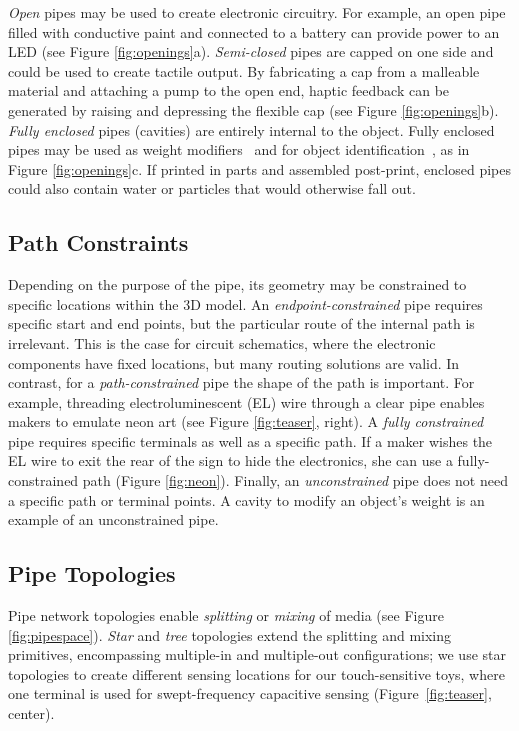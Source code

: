 \emph{Open} pipes may be used to create electronic circuitry.  For example, an open pipe filled with conductive paint and connected to a battery can provide power to an LED (see Figure \ref{fig:openings}a).
%
\emph{Semi-closed} pipes are capped on one side and could be used to create tactile output. By fabricating a cap from a malleable material and attaching a pump to the open end, haptic feedback can be generated by raising and depressing the flexible cap (see Figure \ref{fig:openings}b).
%
\emph{Fully enclosed} pipes (cavities) are entirely internal to the object.  Fully enclosed pipes may be used as weight modifiers~\cite{Prevost-makeitstand} and for object identification~\cite{Willis-infrastructs}, as in Figure \ref{fig:openings}c.  If printed in parts and assembled post-print, enclosed pipes could also contain water or particles that would otherwise fall out.

\subsection{Path Constraints}
Depending on the purpose of the pipe, its geometry may be constrained to specific locations within the 3D model. An \emph{endpoint-constrained} pipe requires specific start and end points, but the particular route of the internal path is irrelevant. This is the case for circuit schematics, where the electronic components have fixed locations, but many routing solutions are valid. In contrast, for a \emph{path-constrained} pipe the shape of the path is important. For example, threading electroluminescent (EL) wire through a clear pipe enables makers to emulate neon art (see Figure \ref{fig:teaser}, right). A \emph{fully constrained} pipe requires specific terminals as well as a specific path. If a maker wishes the EL wire to exit the rear of the sign to hide the electronics, she can use a fully-constrained path (Figure \ref{fig:neon}). Finally, an \emph{unconstrained} pipe does not need a specific path or terminal points. A cavity to modify an object's weight is an example of an unconstrained pipe.

\subsection{Pipe Topologies}
Pipe network topologies enable \emph{splitting} or \emph{mixing} of media (see Figure \ref{fig:pipespace}).  \emph{Star} and \emph{tree} topologies extend the splitting and mixing primitives, encompassing multiple-in and multiple-out configurations; we use star topologies to create different sensing locations for our touch-sensitive toys, where one terminal is used for swept-frequency capacitive sensing (Figure~\ref{fig:teaser}, center).

